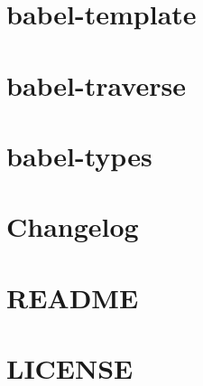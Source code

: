 \documentclass[twoside]{book}
\newcommand{\+}{\discretionary{\mbox{\scriptsize$\hookleftarrow$}}{}{}}
\begin{document}
\chapter{babel-\/template}
\label{md__c_1_workspace_demo_src_main_script_node_modules_babel-template__r_e_a_d_m_e}

\chapter{babel-\/traverse}
\label{md__c_1_workspace_demo_src_main_script_node_modules_babel-traverse__r_e_a_d_m_e}

\chapter{babel-\/types}
\label{md__c_1_workspace_demo_src_main_script_node_modules_babel-types__r_e_a_d_m_e}

\chapter{Changelog}
\label{md__c_1_workspace_demo_src_main_script_node_modules_babylon__c_h_a_n_g_e_l_o_g}

\chapter{R\+E\+A\+D\+ME}
\label{md__c_1_workspace_demo_src_main_script_node_modules_babylon__r_e_a_d_m_e}

\chapter{L\+I\+C\+E\+N\+SE}
\label{md__c_1_workspace_demo_src_main_script_node_modules_balanced-match__l_i_c_e_n_s_e}

\end{document}
